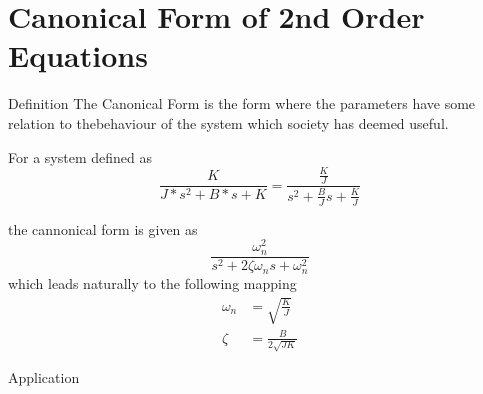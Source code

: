 \documentclass{../templates/topic}
\begin{document}
\chapter{Canonical Form of 2nd Order Equations}

\begin{section}{Definition}
	The Canonical Form is the form where the parameters have some relation to thebehaviour of the system which society has deemed useful.
	
	For a system defined as
	\begin{equation}
		\frac{K}{J*s^2+B*s+K}=\frac{\frac{K}{J}}{s^2+\frac{B}{J}s+\frac{K}{J}}
	\end{equation}
	
	the cannonical form is given as
	\begin{equation}
		\frac{\omega_n^2}{s^2+2\zeta\omega_n s + \omega_n^2}
	\end{equation}
	which leads naturally to the following mapping
	\begin{align}
		\omega_n &= \sqrt{\frac{K}{J}}\\
		\zeta &= \frac{B}{2\sqrt{JK}}
	\end{align}
	
\end{section}

\begin{section}{Application}
\end{section}
\end{document}
